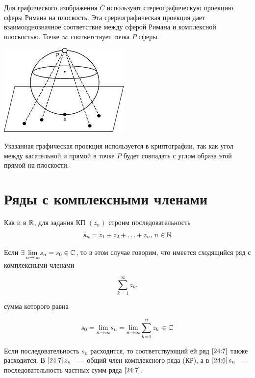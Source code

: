 \documentclass[../../main.tex]{subfiles}
\begin{document}
Для графического изображения $ \overline{C} $ используют стереографическую проекцию сферы Римана на плоскость. Эта сререографическая проекция дает взаимооднозначное соответствие между сферой Римана и комплексной плоскостью. Точке $ \infty $ соответствует точка $P$ сферы.

\begin{center}
	\includegraphics[scale = 0.8]{lec24_1} 
\end{center}

Указанная графическая проекция используется в криптографии, так как угол между касательной и прямой в точке $ P $ будет совпадать с углом образа этой прямой на плоскости.

\section{Ряды с комплексными членами}

Как и в $ \mathbb{R} $, для задания КП $ (z_n) $ строим последовательность 
\begin{equation}\label{24:6}
	s_n = z_1 + z_2 + \ldots + z_n,\, n \in \mathbb{N}
\end{equation}

Если $ \exists\, \underset{n \to \infty}{\lim} s_n = s_0 \in \mathbb{C} $, то в этом случае говорим, что имеется сходящийся ряд с комплексными членами

\begin{equation}\label{24:7}
	\sum_{k=1}^{\infty}z_k,
\end{equation}

сумма которого равна

\begin{equation}\label{24:8}
	s_0 = \underset{n \to \infty}{\lim} s_n = \underset{n \to \infty}{\lim} \sum_{k=1}^{n}z_k\, \in \mathbb{C}
\end{equation}

Если последовательность $ s_n $ расходится, то соответствующий ей ряд $ \eqref{24:7} $ также расходится. В $ \eqref{24:7}\, z_n $ ~--- общий член комплексного ряда (КР), а в $ \eqref{24:6}\, s_n $ ~--- последовательность частных сумм ряда $ \eqref{24:7} $.
\end{document}
